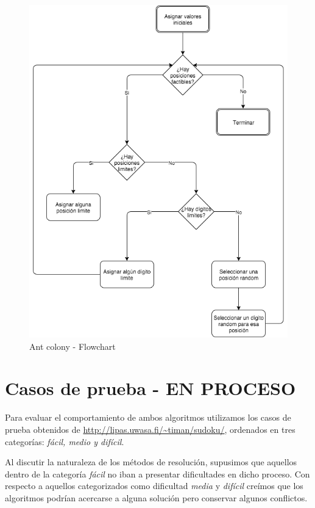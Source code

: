 \documentclass[a4paper,spanish]{article}
\begin{document}
\begin{figure}[h]
	\centering
	\includegraphics[scale=0.55]{./img/ant_workflow.png}
	\caption{Ant colony - Flowchart}
	\label{img:ants_flowchart}
\end{figure}

\clearpage

\section{Casos de prueba - EN PROCESO}

Para evaluar el comportamiento de ambos algoritmos utilizamos los casos de prueba obtenidos de
\url{http://lipas.uwasa.fi/~timan/sudoku/}, ordenados en tres categorías: \textit{fácil, medio y difícil}.

Al discutir la naturaleza de los métodos de resolución, supusimos que aquellos dentro de la
categoría \emph{fácil} no iban a presentar dificultades en dicho proceso. Con respecto a aquellos
categorizados como dificultad \emph{media} y \emph{difícil} creímos que los algoritmos podrían
acercarse a alguna solución pero conservar algunos conflictos.
\end{document}
